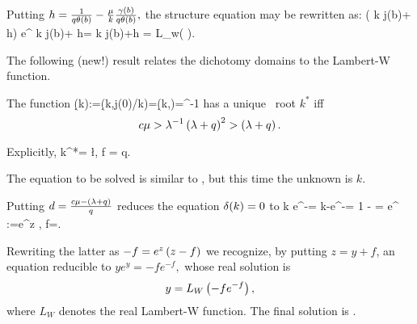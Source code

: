 \eeR

\beR Putting $h=\frac {1}{q \theta(b)}-\frac {\mu } k \frac {\gamma(b)}{q \theta(b)} ,$ the structure equation  may be rewritten as:
\bea (\fr {\mu } k j(b)+ h) e^{\fr {\mu } k j(b)+ h}=  \Lra \fr {\mu } k j(b)+h = L_w( ).\eea
\eeR

The following (new!) result relates the
dichotomy domains  to the  Lambert-W function.

\beL
The  function \be \d(k):=\d(k,j(0)/k)=\d(k,)=\mu^{-1}
\ee
has a unique  \nne\ root
$k^*$  iff
\begin{equation}
\label{Cheapk}c \mu>\lambda^{-1} \left(\lambda+q\right)^2>\left(\lambda+q \right).\end{equation}

Explicitly,
\be {} k^*= \l {}, \; f = q. \ee




\eeL
\prf  The equation to be solved is similar to , but this time the unknown is $k$.

Putting $d =\frac{c\mu-\left(\lambda+
q \right)}q $ %
 reduces the equation $\delta(k)=0$ to
\bea k e^{-}=  k-\lambda  \Eq  e^{-}=  1 - = e^{}
:=e^{z} , f=.
\eea

Rewriting the latter as $-f=e^{z} \left(z -f\right)$  we recognize, by putting $z=y+f$,  an equation
reducible   to $ y e^{y} =- f e^{-f}, $ whose  real solution is $$y =L_W\left(- f e^{-f}\right),$$ where $L_W$ denotes the real Lambert-W function. The final solution
is .
